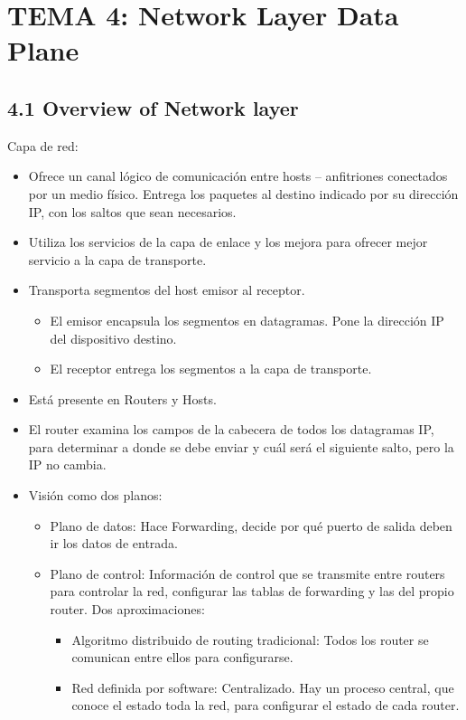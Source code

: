 \documentclass[12pt, twoside, openright]{report} %
\begin{document}
\chapter{TEMA 4: Network Layer Data Plane}

\section{4.1 Overview of Network layer}

Capa de red:

\begin{itemize}
	\item Ofrece un canal lógico de comunicación entre hosts -- anfitriones
	      conectados por un medio físico. Entrega los paquetes al destino
	      indicado por su dirección IP, con los saltos que sean necesarios.
	\item Utiliza los servicios de la capa de enlace y los mejora para
	      ofrecer mejor servicio a la capa de transporte.
	\item Transporta segmentos del host emisor al receptor.

	      \begin{itemize}
		      \item El emisor encapsula los segmentos en datagramas. Pone la
		            dirección IP del dispositivo destino.
		      \item El receptor entrega los segmentos a la capa de transporte.
	      \end{itemize}
	\item Está presente en Routers y Hosts.
	\item El router examina los campos de la cabecera de todos los
	      datagramas IP, para determinar a donde se debe enviar y cuál será
	      el siguiente salto, pero la IP no cambia.
	\item Visión como dos planos:

	      \begin{itemize}
		      \item Plano de datos: Hace Forwarding, decide por qué puerto de salida
		            deben ir los datos de entrada.
		      \item Plano de control: Información de control que se transmite entre
		            routers para controlar la red, configurar las tablas de
		            forwarding y las del propio router. Dos aproximaciones:

		            \begin{itemize}
			            \item Algoritmo distribuido de routing tradicional: Todos los router
			                  se comunican entre ellos para configurarse.
			            \item Red definida por software: Centralizado. Hay un proceso
			                  central, que conoce el estado toda la red, para configurar el
			                  estado de cada router.
		            \end{itemize}
	      \end{itemize}
\end{itemize}
\end{document}
